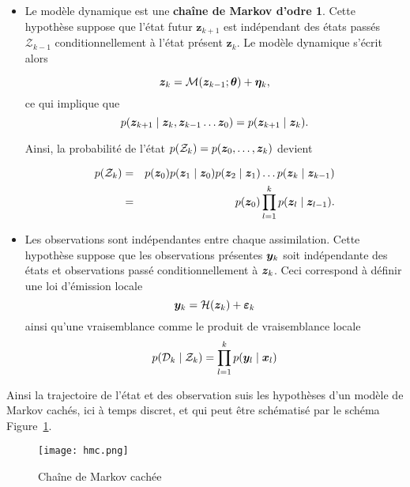 \begin{itemize}
    \item Le modèle dynamique est une \textbf{chaîne de Markov d'odre 1}. Cette hypothèse suppose que l'état futur $\bm z_{k+1}$ est indépendant des états passés $\mathcal Z_{k-1}$ conditionnellement à l'état présent $\bm z_{k}$. Le modèle dynamique s'écrit alors

          \begin{equation*}
              \bm z_k = \mathcal{M}(\bm z_{k-1} ; \bm \theta) + \bm \eta_k,
          \end{equation*}ce qui implique que
          \begin{equation*}
              p(\bz_{k+1} \mid \bz_{k},\bz_{k-1}\dots \bz_{0}) = p(\bz_{k+1} \mid \bz_{k}).
          \end{equation*}

          Ainsi, la probabilité de l'état $p(\mathcal{Z}_k)=p(\bm z_0, \dots, \bm z_k)$ devient

          \begin{eqnarray*}
              p(\mathcal{Z}_k) &=& p(\bm z_0) p(\bm z_1 \mid \bm z_0) p(\bm z_2 \mid \bm z_1) \dots p(\bm z_k \mid \bm z_{k-1}) \\
              &=& p(\bm z_0) \prod_{l = 1}^{k} p(\bm z_l \mid \bm z_{l-1}).
          \end{eqnarray*}

    \item Les observations sont indépendantes entre chaque assimilation. Cette hypothèse suppose que les observations présentes $\bm{y}_k$ soit indépendante des états et observations passé conditionnellement à $\bm z_k$. Ceci correspond à définir une loi d'émission locale
          \begin{equation*}
              \bm{y}_k = \mathcal H (\bm z_k) + \bm{\varepsilon}_k
          \end{equation*}
          ainsi qu'une vraisemblance comme le produit de vraisemblance locale
          \begin{equation*}
              p(\mathcal{D}_k \mid \mathcal Z_k) = \prod_{l=1}^{k} p(\bm{y}_l \mid \bm{x}_l)
          \end{equation*}
\end{itemize}

Ainsi la trajectoire de l'état et des observation suis les hypothèses d'un modèle de Markov cachés, ici à temps discret, et qui peut être schématisé par le schéma Figure~\ref{fig:hidden_markov}.

\begin{figure}[h]
    \centering
    \texttt{[image: hmc.png]}
    \caption{Chaîne de Markov cachée}
    \label{fig:hidden_markov}
\end{figure}

